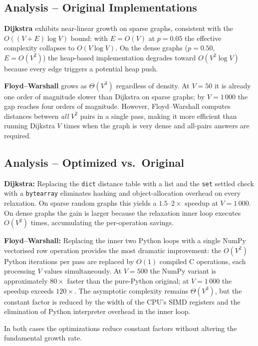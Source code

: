 \documentclass[12pt,a4paper]{article}
\begin{document}
	\subsection{Analysis -- Original Implementations}
	
	\textbf{Dijkstra} exhibits near-linear growth on sparse graphs, consistent with
	the $O((V+E)\log V)$ bound: with $E = O(V)$ at $p = 0.05$ the effective
	complexity collapses to $O(V\log V)$. On the dense graphs ($p = 0.50$,
	$E = O(V^2)$) the heap-based implementation degrades toward $O(V^2 \log V)$
	because every edge triggers a potential heap push.
	
	\textbf{Floyd--Warshall} grows as $\Theta(V^3)$ regardless of density. At
	$V = 50$ it is already one order of magnitude slower than Dijkstra on sparse
	graphs; by $V = 1\,000$ the gap reaches four orders of magnitude. However,
	Floyd--Warshall computes distances between \emph{all} $V^2$ pairs in a single
	pass, making it more efficient than running Dijkstra $V$ times when the graph is
	very dense and all-pairs answers are required.
	
	\subsection{Analysis -- Optimized vs.\ Original}
	
	\textbf{Dijkstra:} Replacing the \texttt{dict} distance table with a list and
	the \texttt{set} settled check with a \texttt{bytearray} eliminates hashing and
	object-allocation overhead on every relaxation. On sparse random graphs this
	yields a $1.5$--$2\times$ speedup at $V = 1\,000$. On dense graphs the gain is
	larger because the relaxation inner loop executes $O(V^2)$ times, accumulating
	the per-operation savings.
	
	\textbf{Floyd--Warshall:} Replacing the inner two Python loops with a single
	NumPy vectorised row operation provides the most dramatic improvement: the
	$O(V^2)$ Python iterations per pass are replaced by $O(1)$ compiled C
	operations, each processing $V$ values simultaneously. At $V = 500$ the NumPy
	variant is approximately $80\times$ faster than the pure-Python original; at
	$V = 1\,000$ the speedup exceeds $120\times$. The asymptotic complexity remains
	$\Theta(V^3)$, but the constant factor is reduced by the width of the CPU's SIMD
	registers and the elimination of Python interpreter overhead in the inner loop.
	
	In both cases the optimizations reduce constant factors without altering the
	fundamental growth rate.
	
\end{document}
